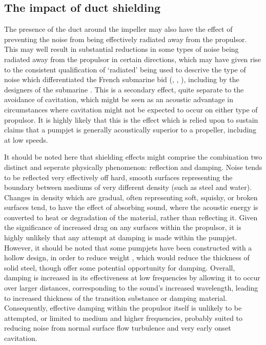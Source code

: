 \documentclass{article}\usepackage[]{graphicx}\usepackage[]{color}
\begin{document}
\subsection{The impact of duct shielding}
The presence of the duct around the impeller may also have the effect of preventing the noise from being effectively radiated away from the propulsor.  This may well result in substantial reductions in some types of noise being radiated away from the propulsor in certain directions, which may have given rise to the consistent qualification of `radiated' being used to descrive the type of noise which differentiated the French submarine bid (\cite{stewart2016}, \cite{davies2017}, \cite{ohff2016}), including by the designers of the submarine \parencite{autret2016}.  This is a secondary effect, quite separate to the avoidance of cavitation, which might be seen as an acoustic advantage in circumstances where cavitation might not be expected to occur on either type of propulsor.  It is highly likely that this is the effect which is relied upon to sustain claims that a pumpjet is generally acoustically superior to a propeller, including at low speeds.

It should be noted here that shielding effects might comprise the combination two distinct and seperate physically phenomenon: reflection and damping.  Noise tends to be reflected very effectively off hard, smooth surfaces representing the boundary between mediums of very different density (such as steel and water).  Changes in density which are gradual, often representing soft, squishy, or broken surfaces tend, to have the effect of absorbing sound, where the acoustic energy is converted to heat or degradation of the material, rather than reflecting it.  Given the significance of increased drag on any surfaces within the propulsor, it is highly unlikely that any attempt at damping is made within the pumpjet.  However, it should be noted that some pumpjets have been constructed with a hollow design, in order to reduce weight \parencite{harvie1965construction}, which would reduce the thickness of solid steel, though offer some potential opportunity for damping.  Overall, damping is increased in its effectiveness at low frequencies by allowing it to occur over larger distances, corresponding to the sound's increased wavelength, leading to increased thickness of the transition substance or damping material.  Consequently, effective damping within the propulsor itself is unlikely to be attempted, or limited to medium and higher frequencies, probably suited to reducing noise from normal surface flow turbulence and very early onset cavitation.
\end{document}
